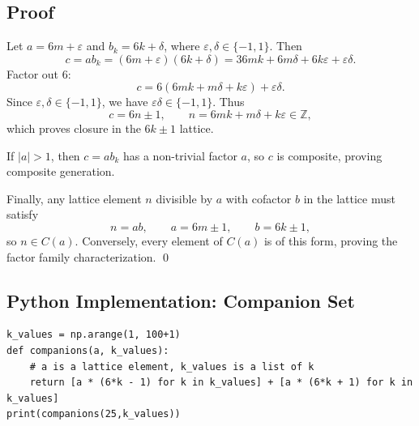 \documentclass[12pt]{article}
\begin{document}
\subsection*{Proof}
Let $a = 6m + \varepsilon$ and $b_k = 6k + \delta$, where
$\varepsilon, \delta \in \{-1, 1\}$. Then
\[
c = a b_k = (6m+\varepsilon)(6k+\delta) = 36mk + 6m\delta + 6k\varepsilon + \varepsilon\delta.
\]
Factor out $6$:
\[
c = 6(6mk + m\delta + k\varepsilon) + \varepsilon\delta.
\]
Since $\varepsilon, \delta \in \{-1, 1\}$, we have $\varepsilon\delta \in \{-1, 1\}$.
Thus
\[
c = 6n \pm 1, \qquad n = 6mk + m\delta + k\varepsilon \in \mathbb{Z},
\]
which proves closure in the $6k\pm1$ lattice.

If $|a| > 1$, then $c = a b_k$ has a non-trivial factor $a$, so $c$ is
composite, proving composite generation.

Finally, any lattice element $n$ divisible by $a$ with cofactor $b$ in the
lattice must satisfy
\[
n = ab, \qquad a = 6m\pm1, \qquad b = 6k\pm1,
\]
so $n \in C(a)$. Conversely, every element of $C(a)$ is of this form, proving
the factor family characterization. \qed

\subsection*{Python Implementation: Companion Set}
\begin{lstlisting}
k_values = np.arange(1, 100+1)
def companions(a, k_values):
    # a is a lattice element, k_values is a list of k
    return [a * (6*k - 1) for k in k_values] + [a * (6*k + 1) for k in k_values]
print(companions(25,k_values))
\end{lstlisting}
\end{document}
